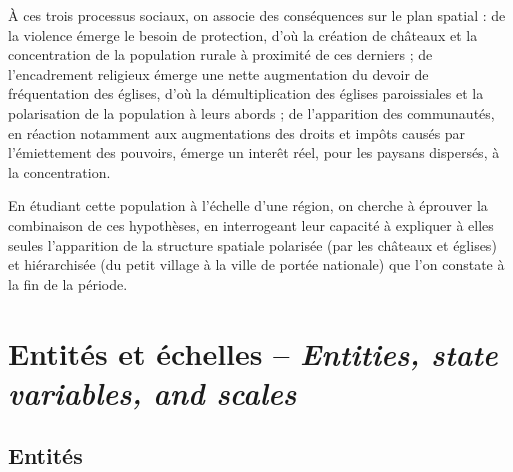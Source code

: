 À ces trois processus sociaux, on associe des conséquences sur le plan spatial : de la violence émerge le besoin de protection, d'où la création de châteaux et la concentration de la population rurale à proximité de ces derniers ; de l'encadrement religieux émerge une nette augmentation du devoir de fréquentation des églises, d'où la démultiplication des églises paroissiales et la polarisation de la population à leurs abords ; de l'apparition des communautés, en réaction notamment aux augmentations des droits et impôts causés par l'émiettement des pouvoirs, émerge un interêt réel, pour les paysans dispersés, à la concentration.

En étudiant cette population à l'échelle d'une région, on cherche à éprouver la combinaison de ces hypothèses, en interrogeant leur capacité à expliquer à elles seules l'apparition de la structure spatiale polarisée (par les châteaux et églises) et hiérarchisée (du petit village à la ville de portée nationale) que l'on constate à la fin de la période.

\let\orisectionmark\sectionmark
\renewcommand\sectionmark[1]{}%
\section[Entités et échelles -- \textit{Entities, state variables, and scales}]{Entités et échelles -- \large{\textit{Entities, state variables, and scales}}}
\orisectionmark{Entités et échelles}
\let\sectionmark\orisectionmark

\subsection{Entités \label{subsec:entites}}


%		

